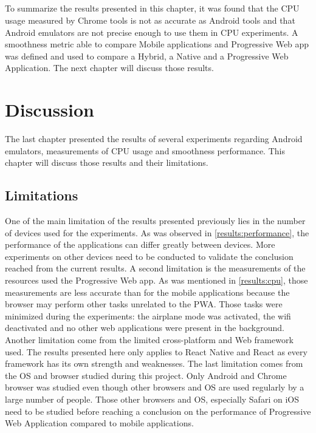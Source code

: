 \documentclass{kththesis}
\begin{document}
\paragraph{}
To summarize the results presented in this chapter, it was found that the CPU usage measured by Chrome tools is not as accurate as Android tools and that Android emulators are not precise enough to use them in CPU experiments. A smoothness metric able to compare Mobile applications and Progressive Web app was defined and used to compare a Hybrid, a Native and a Progressive Web Application. The next chapter will discuss those results.


\chapter{Discussion}

The last chapter presented the results of several experiments regarding Android emulators, measurements of CPU usage and smoothness performance. This chapter will discuss those results and their limitations.

\section{Limitations}
One of the main limitation of the results presented previously lies in the number of devices used for the experiments. As was observed in \autoref{results:performance}, the performance of the applications can differ greatly between devices. More experiments on other devices need to be conducted to validate the conclusion reached from the current results. \newline
A second limitation is the measurements of the resources used the Progressive Web app. As was mentioned in \autoref{results:cpu}, those measurements are less accurate than for the mobile applications because the browser may perform other tasks unrelated to the PWA. Those tasks were minimized during the experiments: the airplane mode was activated, the wifi deactivated and no other web applications were present in the background. \newline
Another limitation come from the limited cross-platform and Web framework used. The results presented here only applies to React Native and React as every framework has its own strength and weaknesses. 
The last limitation comes from the OS and browser studied during this project. Only Android and Chrome browser was studied even though other browsers and OS are used regularly by a large number of people. Those other browsers and OS, especially Safari on iOS need to be studied before reaching a conclusion on the performance of Progressive Web Application compared to mobile applications.
\end{document}
